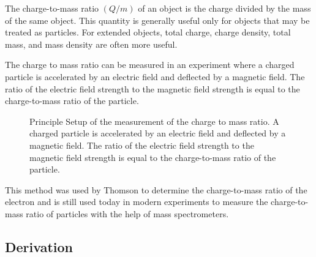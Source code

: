 \documentclass[
  a4paper,
]{book}
\begin{document}
\begin{tcolorbox}[enhanced jigsaw, coltitle=black, title=\textcolor{quarto-callout-note-color}{\faInfo}\hspace{0.5em}{Charge-to-Mass Ratio (Q/m)}, colframe=quarto-callout-note-color-frame, toprule=.15mm, opacitybacktitle=0.6, left=2mm, opacityback=0, breakable, toptitle=1mm, bottomtitle=1mm, leftrule=.75mm, arc=.35mm, titlerule=0mm, colbacktitle=quarto-callout-note-color!10!white, rightrule=.15mm, bottomrule=.15mm, colback=white]

The charge-to-mass ratio \((Q/m)\) of an object is the charge divided by
the mass of the same object. This quantity is generally useful only for
objects that may be treated as particles. For extended objects, total
charge, charge density, total mass, and mass density are often more
useful.

The charge to mass ratio can be measured in an experiment where a
charged particle is accelerated by an electric field and deflected by a
magnetic field. The ratio of the electric field strength to the magnetic
field strength is equal to the charge-to-mass ratio of the particle.

\begin{figure}[H]


\caption{\label{fig-ebym}Principle Setup of the measurement of the
charge to mass ratio. A charged particle is accelerated by an electric
field and deflected by a magnetic field. The ratio of the electric field
strength to the magnetic field strength is equal to the charge-to-mass
ratio of the particle.}

\end{figure}%

This method was used by Thomson to determine the charge-to-mass ratio of
the electron and is still used today in modern experiments to measure
the charge-to-mass ratio of particles with the help of mass
spectrometers.

\subsection{Derivation}\label{derivation-1}


\end{tcolorbox}
\end{document}
